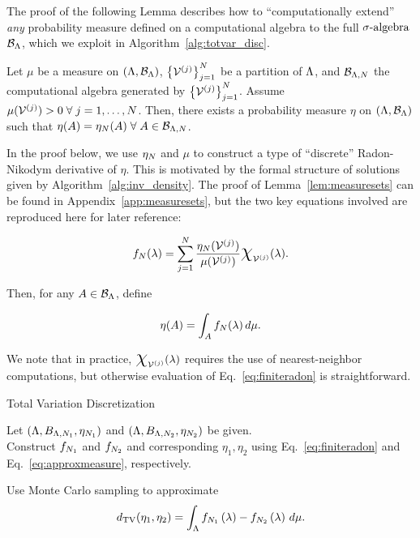 The proof of the following Lemma describes how to ``computationally extend'' {\em any} probability measure defined on a computational algebra to the full $\sigma\text{-algebra}$ $\mathcal{B}_{{\Lambda}}$, which we exploit in Algorithm~\ref{alg:totvar_disc}.

\begin{lem}
\label{lem:measuresets}
Let $\mu$ be a measure on $({\Lambda}, \mathcal{B}_{\Lambda})$, $\left\{\mathcal{V}^{(j)}\right\}_{j=1}^{N}$ be a partition of ${\Lambda}$, and $\mathcal{B}_{{\Lambda}, N}$ the computational algebra generated by $\left\{\mathcal{V}^{(j)}\right\}_{j=1}^{N}$.
Assume $\mu (\mathcal{V}^{(j)}) > 0 \; \forall \; j=1,\hdots, N$.
Then, there exists a probability measure $\eta$ on $({\Lambda}, \mathcal{B}_{\Lambda})$ such that $\eta(A) = \eta_N(A) \; \forall \; A\in\mathcal{B}_{{\Lambda}, N}$.
\end{lem}
In the proof below, we use $\eta_N$ and $\mu$ to construct a type of ``discrete'' Radon-Nikodym derivative of $\eta$.
This is motivated by the formal structure of solutions given by Algorithm~\ref{alg:inv_density}.
The proof of Lemma~\ref{lem:measuresets} can be found in Appendix~\ref{app:measuresets}, but the two key equations involved are reproduced here for later reference:

\begin{equation}\label{eq:finiteradon}
f_\nsamps (\param) = \sum_{j=1}^{\nsamps} \frac{\eta_\nsamps (\VV^{(j)}) }{\mu (\VV^{(j)})} \Chi_{\VV^{(j)}} (\param).
\end{equation}

Then, for any $A\in\mathcal{B}_{\Lambda}$, define

\begin{equation}\label{eq:approxmeasure}
\eta (A) = \int_A f_N (\lambda) \, d\mu.
\end{equation}

We note that in practice, $\Chi_{\VV^{(j)}} (\param)$ requires the use of nearest-neighbor computations, but otherwise evaluation of Eq.~\eqref{eq:finiteradon} is straightforward.


\begin{algorithm}
\DontPrintSemicolon
\caption{Total Variation Discretization}
\label{alg:totvar_disc}
Let $({\Lambda}, B_{{\Lambda}, N_1}, \eta_{N_1} )$ and $({\Lambda}, B_{{\Lambda}, N_2}, \eta_{N_2} )$ be given.\\

Construct $f_{N_1}$ and $f_{N_2}$ and corresponding $\eta_1, \eta_2$ using Eq.~\eqref{eq:finiteradon} and Eq.~\eqref{eq:approxmeasure}, respectively.

Use Monte Carlo sampling to approximate
$$d_\text{TV}(\eta_1, \eta_2) = \int_{\Lambda} f_{N_1}\left ( \lambda \right ) - f_{N_2}\left ( \lambda \right ) \, d\mu.$$
\end{algorithm}

